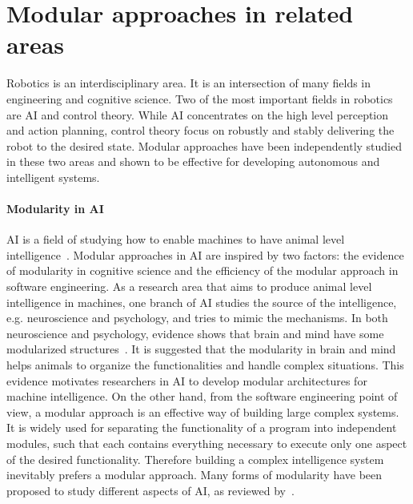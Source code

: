 \section{Modular approaches in related areas}
\label{cha1:modular}
Robotics is an interdisciplinary area. It is an intersection of many fields in engineering and cognitive science. Two of the most important fields in robotics are AI and control theory. While AI concentrates on the high level perception and action planning, control theory focus on robustly and stably delivering the robot to the desired state. Modular approaches have been independently studied in these two areas and shown to be effective for developing autonomous and intelligent systems.

\paragraph{Modularity in AI}
AI is a field of studying how to enable machines to have animal level intelligence~\citep{brooks1991intelligence}. Modular approaches in AI are inspired by two factors: the evidence of modularity in cognitive science and the efficiency of the modular approach in software engineering.
As a research area that aims to produce animal level intelligence in machines, one branch of AI studies the source of the intelligence, e.g. neuroscience and psychology, and tries to mimic the mechanisms. In both neuroscience and psychology, evidence shows that brain and mind have some modularized structures~\citep{fodor1983modularity,peretz2003modularity,barrett2006modularity,sztarker2011brain}. It is suggested that the modularity in brain and mind helps animals to organize the functionalities and handle complex situations. This evidence motivates researchers in AI to develop modular architectures for machine intelligence. On the other hand, from the software engineering point of view, a modular approach is an effective way of building large complex systems. It is widely used for separating the functionality of a program into independent modules, such that each contains everything necessary to execute only one aspect of the desired functionality. Therefore building a complex intelligence system inevitably prefers a modular approach. Many forms of modularity have been proposed to study different aspects of AI, as reviewed by~\citet{bryson2004modular}.


